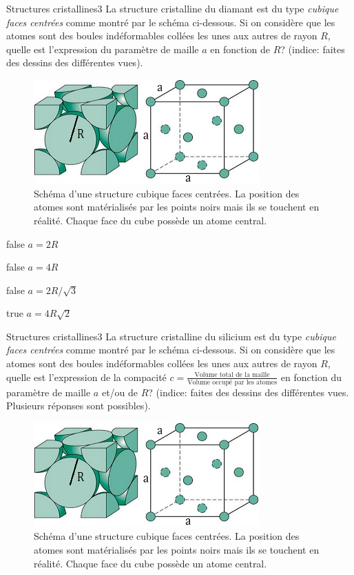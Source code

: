         \begin{question}{31}{Structures cristallines}{3}{}
            La structure cristalline du diamant est du type \emph{cubique faces centrées} comme montré par le schéma ci-dessous. Si on considère que les atomes sont des boules indéformables collées les unes aux autres de rayon $R$, quelle est l'expression du paramètre de maille $a$ en fonction de $R$? (indice: faites des dessins des différentes vues).
            \begin{figure}
                \centering
                \includegraphics[height = 4cm]{Antoine/Figures_Antoine/FCC.png}
                \caption{Schéma d'une structure cubique faces centrées. La position des atomes sont matérialisés par les points noirs mais ils se touchent en réalité.  Chaque face du cube possède un atome central.}
            \end{figure}
        \end{question}
        \begin{reponses} 
            \item[false] $a = 2R$
            \item[false] $a = 4R$
            \item[false] $a = 2R/\sqrt{3}$
    	    \item[true] $a = 4R\sqrt{2}$
        \end{reponses}
        \begin{question}{31}{Structures cristallines}{3}{}
            La structure cristalline du silicium est du type \emph{cubique faces centrées} comme montré par le schéma ci-dessous. Si on considère que les atomes sont des boules indéformables collées les unes aux autres de rayon $R$, quelle est l'expression de la compacité $c = \frac{\text{Volume total de la maille}}{\text{Volume occupé par les atomes}}$ en fonction du paramètre de maille $a$ et/ou de $R$? (indice: faites des dessins des différentes vues. Plusieurs réponses sont possibles).
            \begin{figure}
                \centering
                \includegraphics[height = 4cm]{Antoine/Figures_Antoine/FCC.png}
                \caption{Schéma d'une structure cubique faces centrées. La position des atomes sont matérialisés par les points noirs mais ils se touchent en réalité.  Chaque face du cube possède un atome central.}
            \end{figure}
        \end{question}
